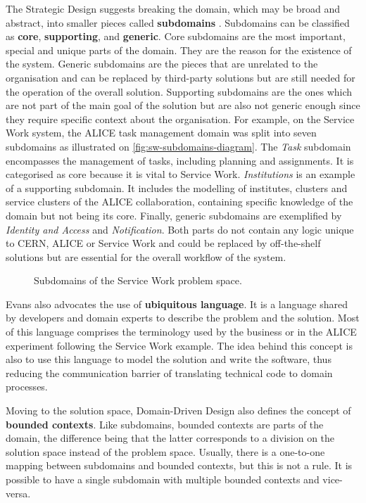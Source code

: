 The Strategic Design suggests breaking the domain, which may be broad and abstract, into smaller pieces called \textbf{subdomains} \cite{petter-holmstrom-part1}. Subdomains can be classified as \textbf{core}, \textbf{supporting}, and \textbf{generic}. Core subdomains are the most important, special and unique parts of the domain. They are the reason for the existence of the system. Generic subdomains are the pieces that are unrelated to the organisation and can be replaced by third-party solutions but are still needed for the operation of the overall solution. Supporting subdomains are the ones which are not part of the main goal of the solution but are also not generic enough since they require specific context about the organisation. For example, on the Service Work system, the ALICE task management domain was split into seven subdomains as illustrated on \autoref{fig:sw-subdomains-diagram}. The \textit{Task} subdomain encompasses the management of tasks, including planning and assignments. It is categorised as core because it is vital to Service Work. \textit{Institutions} is an example of a supporting subdomain. It includes the modelling of institutes, clusters and service clusters of the ALICE collaboration, containing specific knowledge of the domain but not being its core. Finally, generic subdomains are exemplified by \textit{Identity and Access} and \textit{Notification}. Both parts do not contain any logic unique to CERN, ALICE or Service Work and could be replaced by off-the-shelf solutions but are essential for the overall workflow of the system.

\begin{figure}[htbp]
  \centering
  
  \caption{Subdomains of the Service Work problem space.}
  \label{fig:sw-subdomains-diagram}
\end{figure}

Evans \cite{ddd-blue-book} also advocates the use of \textbf{ubiquitous language}. It is a language shared by developers and domain experts to describe the problem and the solution. Most of this language comprises the terminology used by the business or in the ALICE experiment following the Service Work example. The idea behind this concept is also to use this language to model the solution and write the software, thus reducing the communication barrier of translating technical code to domain processes.

Moving to the solution space, Domain-Driven Design also defines the concept of \textbf{bounded contexts}. Like subdomains, bounded contexts are parts of the domain, the difference being that the latter corresponds to a division on the solution space instead of the problem space. Usually, there is a one-to-one mapping between subdomains and bounded contexts, but this is not a rule. It is possible to have a single subdomain with multiple bounded contexts and vice-versa.


